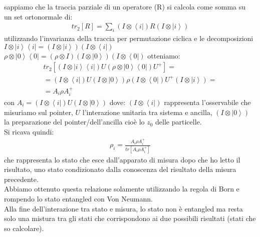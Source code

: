 sappiamo che la traccia parziale di un operatore (R) si calcola come somma su\\un set ortonormale di:
\begin{equation}\begin{split}
tr_{2}[R]= \sum_{i}(I\otimes\left\langle i\right|)R(I\otimes\left|i\right\rangle)
\end{split}\end{equation}
utilizzando l'invarianza della traccia per permutazione ciclica e le decomposizioni $I\otimes\left|i\right\rangle\left\langle i\right|=(I\otimes\left|i\right\rangle)(I\otimes\left\langle i\right|)$  $\rho\otimes\left|0\right\rangle\left\langle 0\right|=(\rho\otimes I)(I\otimes\left|0\right\rangle)(I\otimes\left\langle0\right|)$ otteniamo:
\begin{equation}\begin{split}
tr_{2}[(I\otimes\left|i\right\rangle\left\langle i\right|)U(\rho\otimes\left|0\right\rangle\left\langle 0\right|)U^+]=\\
=(I\otimes\left\langle i\right|)U(I\otimes\left|0\right\rangle)\rho(I\otimes\left\langle 0\right|)U^+(I\otimes\left|i\right\rangle)= \\
=A_{i}\rho A_{i}^+
\end{split}\end{equation}
con $A_{i}=(I\otimes\left\langle i\right|)U(I\otimes\left|0\right\rangle)$ dove:
$(I\otimes\left\langle i\right|)$ rappresenta l'osservabile che misuriamo sul pointer, $U$ l'interazione unitaria tra sistema e ancilla, $(I\otimes\left|0\right\rangle)$ la preparazione del pointer/dell'ancilla cioè lo $z_{0}$ delle particelle. \\
Si ricava quindi:
\begin{equation}\begin{split}
\rho_{i}=\frac{A_{i}\rho A_{i}^+}{tr[A_{i}\rho A_{i}^+]}
\end{split}\end{equation}
che rappresenta lo stato che esce dall'apparato di misura dopo che ho letto il risultato, uno stato condizionato dalla conoscenza del risultato della misura precedente. \\
Abbiamo ottenuto questa relazione solamente utilizzando la regola di Born e rompendo lo stato entangled con Von Neumann.\\
Alla fine dell'interazione tra stato e misura, lo stato non è entangled ma resta solo una mistura tra gli stati che corrispondono ai due possibili risultati (stati che so calcolare).

%